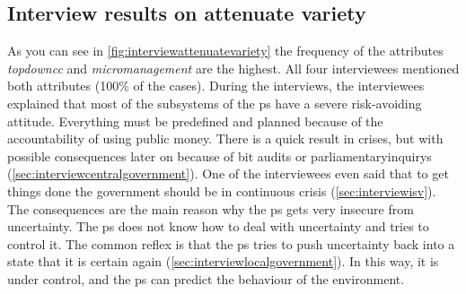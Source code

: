\subsection{Interview results on attenuate variety}
\label{sub:interviewresultsattenuate}
As you can see in \cref{fig:interviewattenuatevariety} the frequency of the attributes \textit{\gls{topdowncc}} and \textit{\gls{micromanagement}} are the highest. All four interviewees mentioned both \glspl{attribute} (100\% of the cases). During the interviews, the interviewees explained that most of the subsystems of the \gls{ps} have a severe risk-avoiding attitude. Everything must be predefined and planned because of the accountability of using public money. There is a quick result in crises, but with possible consequences later on because of \acrfull{bit} audits or \glspl{parliamentaryinquiry} (\cref{sec:interviewcentralgovernment}). One of the interviewees even said that to get things done the government should be in continuous crisis (\cref{sec:interviewisv}). The consequences are the main reason why the \gls{ps} gets very insecure from \gls{uncertainty}. The \gls{ps} does not know how to deal with \gls{uncertainty} and tries to control it. The common reflex is that the \gls{ps} tries to push \gls{uncertainty} back into a state that it is certain again (\cref{sec:interviewlocalgovernment}). In this way, it is under control, and the \gls{ps} can predict the behaviour of the environment. 

